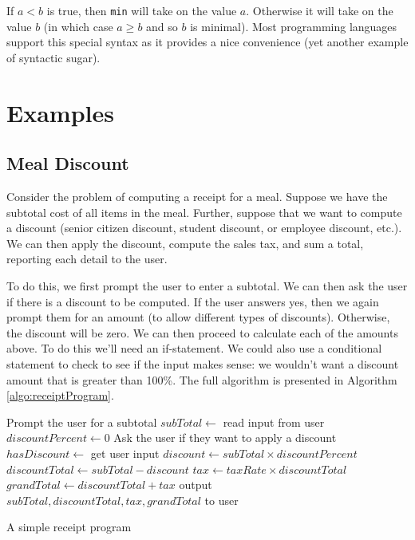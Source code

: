 If $a < b$ is true, then \texttt{min} will take on the value $a$.  Otherwise it will take
on the value $b$ (in which case $a \geq b$ and so $b$ is minimal). Most 
programming languages support this special syntax as it provides a nice convenience
(yet another example of \gls{syntactic sugar}).

\section{Examples}

\subsection{Meal Discount}

Consider the problem of computing a receipt for a meal.  Suppose we have the 
subtotal cost of all items in the meal.  Further, suppose that we want to compute
a discount (senior citizen discount, student discount, or employee discount, etc.).
We can then apply the discount, compute the sales tax, and sum a total, reporting
each detail to the user.

To do this, we first prompt the user to enter a subtotal.  We can then ask the
user if there is a discount to be computed.  If the user answers yes, then we
again prompt them for an amount (to allow different types of discounts).  Otherwise,
the discount will be zero.  We can then proceed to calculate each of the amounts
above.  To do this we'll need an if-statement.  We could also use a conditional
statement to check to see if the input makes sense: we wouldn't want a discount
amount that is greater than 100\%.  The full algorithm is presented in 
Algorithm \ref{algo:receiptProgram}.

\begin{algorithm}[H]
Prompt the user for a subtotal \;
$subTotal \leftarrow $ read input from user \;
$discountPercent \leftarrow 0$ \;
Ask the user if they want to apply a discount \;
$hasDiscount \leftarrow $ get user input
$discount \leftarrow subTotal \times discountPercent$ \;
$discountTotal \leftarrow subTotal - discount$ \;
$tax \leftarrow taxRate \times discountTotal$ \;
$grandTotal \leftarrow discountTotal + tax$ \;
output $subTotal, discountTotal, tax, grandTotal$ to user \;
\caption{A simple receipt program}
\label{algo:receiptProgram}
\end{algorithm}


